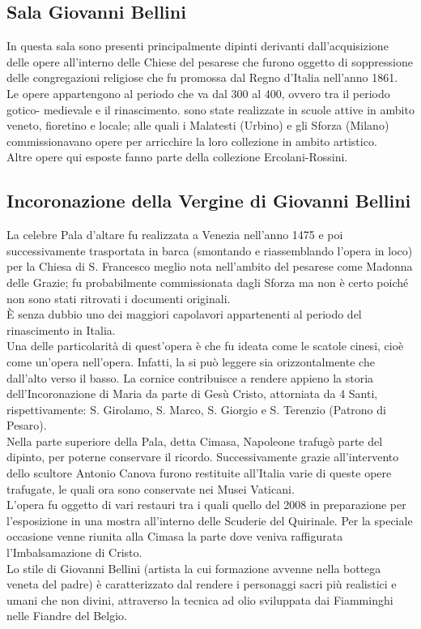 \documentclass[hidelinks,12pt,a4paper]{article}
\begin{document}
\begin{flushleft}
			\section{Sala Giovanni Bellini}
			In questa sala sono presenti principalmente dipinti derivanti dall'acquisizione delle opere all'interno delle Chiese del pesarese che furono oggetto di soppressione delle congregazioni religiose che fu promossa dal Regno d'Italia nell'anno 1861.\\
			Le opere appartengono al periodo che va dal  300 al 400, ovvero tra il periodo gotico- medievale e il rinascimento. sono state realizzate in scuole attive in ambito veneto, fioretino e locale; alle quali i Malatesti (Urbino) e gli Sforza (Milano) commissionavano opere per arricchire la loro collezione in ambito artistico.\\
			Altre opere qui esposte fanno parte della collezione Ercolani-Rossini.
	
			\subsection{Incoronazione della Vergine di Giovanni Bellini}
			La celebre Pala d'altare fu realizzata a Venezia nell'anno 1475 e poi successivamente trasportata in barca (smontando e riassemblando l'opera in loco) per la Chiesa di S. Francesco meglio nota nell'ambito del pesarese come Madonna delle Grazie; fu probabilmente commissionata dagli Sforza ma non è certo poiché non sono stati ritrovati i documenti originali.\\
			È senza dubbio uno dei maggiori capolavori appartenenti al periodo del rinascimento in Italia.\\
			Una delle particolarità di quest'opera è che fu ideata come le scatole cinesi, cioè come un’opera nell'opera. Infatti, la si può leggere sia orizzontalmente che dall'alto verso il basso. La cornice contribuisce a rendere appieno la storia dell'Incoronazione di Maria da parte di Gesù Cristo, attorniata da 4 Santi, rispettivamente: S. Girolamo, S. Marco, S. Giorgio e S. Terenzio (Patrono di Pesaro). \\
			Nella parte superiore della Pala, detta Cimasa, Napoleone trafugò parte del dipinto, per poterne conservare il ricordo. Successivamente grazie all'intervento dello scultore Antonio Canova furono restituite all'Italia varie di queste opere trafugate, le quali ora sono conservate nei Musei Vaticani.\\
			L'opera fu oggetto di vari restauri tra i quali quello del 2008 in preparazione per l'esposizione in una mostra all'interno delle Scuderie del Quirinale. Per la speciale occasione venne riunita alla Cimasa la parte dove veniva raffigurata l’Imbalsamazione di Cristo.\\
			Lo stile di Giovanni Bellini (artista la cui formazione avvenne nella bottega veneta del padre)  è caratterizzato dal rendere i personaggi sacri più realistici e umani che non divini, attraverso la tecnica ad olio sviluppata dai Fiamminghi nelle Fiandre del Belgio.
	

\end{flushleft}
\end{document}
